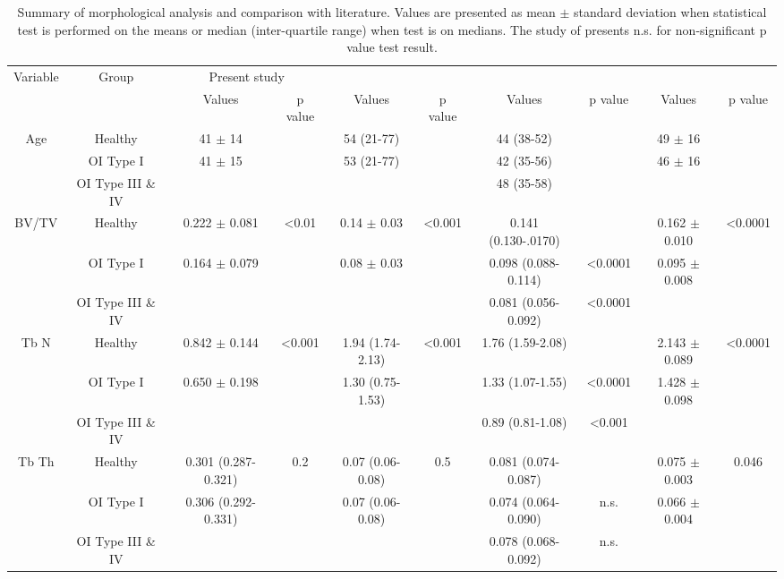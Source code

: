 \documentclass[a4paper,fleqn]{DC_ArtStyle}
\begin{document}
\begin{sidewaystable*}
	\centering
	\caption{Summary of morphological analysis and comparison with literature. Values are presented as mean $\pm$ standard deviation when statistical test is performed on the means or median (inter-quartile range) when test is on medians. The study of \cite{Kocijan2015} presents n.s. for non-significant p value test result.}
	\label{Table2}
	\begin{tabular}{cccccccccc}
		\toprule
		\multirow{2}{*}{Variable} & \multirow{2}{*}{Group} & \multicolumn{2}{c}{Present study} & \multicolumn{2}{c}{\citeauthor{Folkestad2012}\cite{Folkestad2012}} & \multicolumn{2}{c}{\citeauthor{Kocijan2015}\cite{Kocijan2015}} & \multicolumn{2}{c}{\citeauthor{Rolvien2018}\cite{Rolvien2018}} \\
		& & Values & p value & Values & p value & Values & p value & Values & p value \\
		\midrule
		
		\multirow{3}{*}{Age} & Healthy & 41 $\pm$ 14 &  & 54 (21-77) & & 44 (38-52) &  & 49 $\pm$ 16 &  \\
		& OI Type I & \multirow{2}{*}{41 $\pm$ 15} &  & 53 (21-77) &  & 42 (35-56) & & \multirow{2}{*}{46 $\pm$ 16} & \\
		&  OI Type III \& IV & &  &  &  & 48 (35-58) & & & \\[3ex]
		
		\multirow{3}{*}{BV/TV} & Healthy & 0.222 $\pm$ 0.081 & <0.01 & 0.14 $\pm$ 0.03 & <0.001 & 0.141 (0.130-.0170) & & 0.162 $\pm$ 0.010 & <0.0001 \\
		& OI Type I & \multirow{2}{*}{0.164 $\pm$ 0.079} &  & 0.08 $\pm$ 0.03 &  & 0.098 (0.088-0.114) & <0.0001 & \multirow{2}{*}{0.095 $\pm$ 0.008} & \\
		&  OI Type III \& IV & & & & & 0.081 (0.056-0.092) & <0.0001 & & \\[3ex]
		
		\multirow{3}{*}{Tb N} & Healthy & 0.842 $\pm$ 0.144 & <0.001 & 1.94 (1.74-2.13) & <0.001 & 1.76 (1.59-2.08) & & 2.143 $\pm$ 0.089 & <0.0001 \\
		& OI Type I & \multirow{2}{*}{0.650 $\pm$ 0.198} &  & 1.30 (0.75-1.53) &  & 1.33 (1.07-1.55) & <0.0001 & \multirow{2}{*}{1.428 $\pm$ 0.098} & \\
		&  OI Type III \& IV & & & & & 0.89 (0.81-1.08) & <0.001 & & \\[3ex]
		
		\multirow{3}{*}{Tb Th} & Healthy & 0.301 (0.287-0.321) & 0.2 & 0.07 (0.06-0.08) & 0.5 & 0.081 (0.074-0.087) & & 0.075 $\pm$ 0.003 & 0.046 \\
		& OI Type I & \multirow{2}{*}{0.306 (0.292-0.331)} &  & 0.07 (0.06-0.08) &  & 0.074 (0.064-0.090) & n.s. & \multirow{2}{*}{0.066 $\pm$ 0.004} & \\
		&  OI Type III \& IV & & & & & 0.078 (0.068-0.092) & n.s. & & \\[3ex]
		

\end{tabular}
\end{sidewaystable*}
\end{document}
